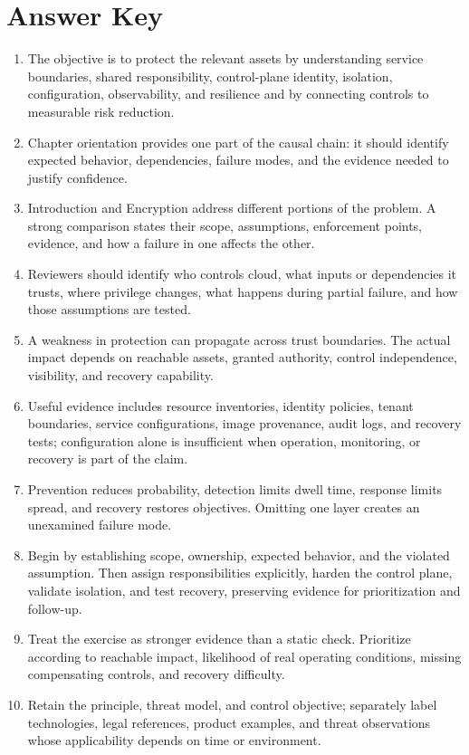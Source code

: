 \documentclass[11pt]{article}
\begin{document}
\section*{Answer Key}
\begin{enumerate}
\item The objective is to protect the relevant assets by understanding service boundaries, shared responsibility, control-plane identity, isolation, configuration, observability, and resilience and by connecting controls to measurable risk reduction.
\item Chapter orientation provides one part of the causal chain: it should identify expected behavior, dependencies, failure modes, and the evidence needed to justify confidence.
\item Introduction and Encryption address different portions of the problem. A strong comparison states their scope, assumptions, enforcement points, evidence, and how a failure in one affects the other.
\item Reviewers should identify who controls cloud, what inputs or dependencies it trusts, where privilege changes, what happens during partial failure, and how those assumptions are tested.
\item A weakness in protection can propagate across trust boundaries. The actual impact depends on reachable assets, granted authority, control independence, visibility, and recovery capability.
\item Useful evidence includes resource inventories, identity policies, tenant boundaries, service configurations, image provenance, audit logs, and recovery tests; configuration alone is insufficient when operation, monitoring, or recovery is part of the claim.
\item Prevention reduces probability, detection limits dwell time, response limits spread, and recovery restores objectives. Omitting one layer creates an unexamined failure mode.
\item Begin by establishing scope, ownership, expected behavior, and the violated assumption. Then assign responsibilities explicitly, harden the control plane, validate isolation, and test recovery, preserving evidence for prioritization and follow-up.
\item Treat the exercise as stronger evidence than a static check. Prioritize according to reachable impact, likelihood of real operating conditions, missing compensating controls, and recovery difficulty.
\item Retain the principle, threat model, and control objective; separately label technologies, legal references, product examples, and threat observations whose applicability depends on time or environment.
\end{enumerate}
\end{document}
